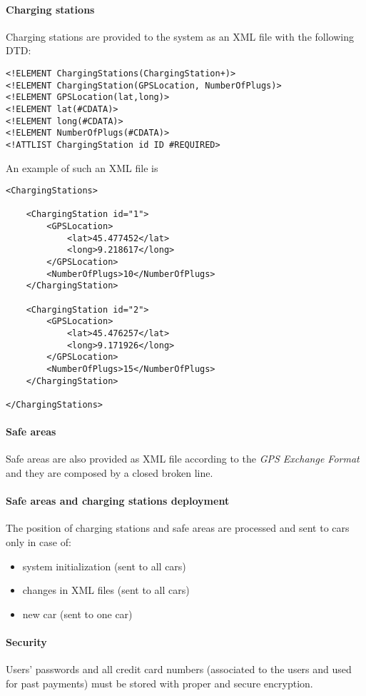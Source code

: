 \paragraph{Charging stations}Charging stations are provided to the system as an XML file with the following DTD:
\lstset{language=XML,frame=false}
\begin{lstlisting}
<!ELEMENT ChargingStations(ChargingStation+)>
<!ELEMENT ChargingStation(GPSLocation, NumberOfPlugs)>
<!ELEMENT GPSLocation(lat,long)>
<!ELEMENT lat(#CDATA)>
<!ELEMENT long(#CDATA)>
<!ELEMENT NumberOfPlugs(#CDATA)>
<!ATTLIST ChargingStation id ID #REQUIRED>
\end{lstlisting}
An example of such an XML file is 
\begin{lstlisting}
<ChargingStations>

	<ChargingStation id="1">
		<GPSLocation>
			<lat>45.477452</lat>
			<long>9.218617</long>
		</GPSLocation>
		<NumberOfPlugs>10</NumberOfPlugs>
	</ChargingStation>
	
	<ChargingStation id="2">
		<GPSLocation>
			<lat>45.476257</lat>
			<long>9.171926</long>
		</GPSLocation>
		<NumberOfPlugs>15</NumberOfPlugs>
	</ChargingStation>
	
</ChargingStations>
\end{lstlisting}

\paragraph{Safe areas}Safe areas are also provided as XML file according to the \emph{GPS Exchange Format} and they are composed by a closed broken line.

\paragraph{Safe areas and charging stations deployment}The position of charging stations and safe areas are processed and sent to cars only in case of:
\begin{itemize}
	\item system initialization (sent to all cars)
	\item changes in XML files (sent to all cars)
	\item new car (sent to one car)
\end{itemize}

\paragraph{Security}Users' passwords and all credit card numbers (associated to the users and used for past payments) must be stored with proper and secure encryption.

